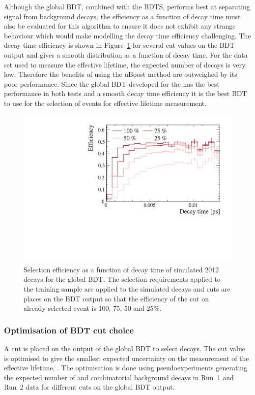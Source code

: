 Although the global BDT, combined with the BDTS, performs best at separating signal from background decays, the efficiency as a function of decay time must also be evaluated for this algorithm to ensure it does not exhibit any strange behaviour which would make modelling the decay time efficiency challenging. The decay time efficiency is shown in Figure~\ref{fig:accptsBFBDTs} for several cut values on the BDT output and gives a smooth distribution as a function of decay time. For the data set used to measure the \bsmumu effective lifetime, the expected number of \bsmumu decays is very low. Therefore the benefits of using the uBoost method are outweighed by its poor performance. Since the global BDT developed for the \BFm has the best performance in both tests and a smooth decay time efficiency it is the best BDT to use for the selection of events for effective lifetime measurement. 
\begin{figure}[tbp]
    \centering
        \includegraphics[width=0.6 \textwidth]{./Figs/Selection/BDT1_acceptances.pdf}
    \caption{Selection efficiency as a function of decay time of simulated 2012 \bsmumu decays for the global BDT. The selection requirements applied to the training sample are applied to the simulated decays and cuts are places on the BDT output so that the efficiency of the cut on already selected event is 100, 75, 50 and 25$\%$. }
    \label{fig:accptsBFBDTs}
\end{figure}

\subsubsection{Optimisation of BDT cut choice}
\label{sec:globalBDToptimisation}

A cut is placed on the output of the global BDT to select \bsmumu decays. The cut value is optimised to give the smallest expected uncertainty on the measurement of the \bsmumu effective lifetime, \tmumu. The optimisation is done using pseudoexperiments generating the expected number of \bsmumu and combinatorial background decays in Run~1 and Run~2 data for different cuts on the global BDT output.

